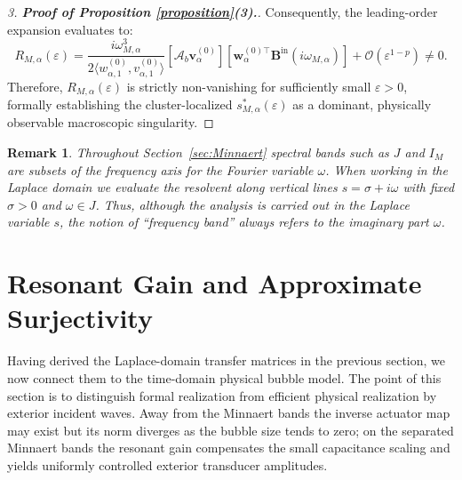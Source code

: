 \documentclass[11pt,a4paper]{article}
\numberwithin{equation}{section}
\newtheorem{remark}[theorem]{Remark}
\begin{document}
\begin{proof}[3. \textbf{Proof of Proposition \ref{proposition}(3).}]
\newline
Consequently, the leading-order expansion evaluates to:
\begin{equation}
    R_{M, \alpha}(\varepsilon) = \frac{i\omega_{M,\alpha}^3}{2\langle w_{\alpha, 1}^{(0)}, v_{\alpha, 1}^{(0)} \rangle} \left[ \mathcal{A}_b \mathbf{v}_\alpha^{(0)} \right] \left[ \mathbf{w}_\alpha^{(0)\top} \mathbf{B}^{\text{in}}(i\omega_{M,\alpha}) \right] + \mathcal{O}(\varepsilon^{1-p}) \neq 0.
\end{equation}
Therefore, $R_{M, \alpha}(\varepsilon)$ is strictly non-vanishing for sufficiently small $\varepsilon > 0$, formally establishing the cluster-localized $s_{M, \alpha}^\ast(\varepsilon)$ as a dominant, physically observable macroscopic singularity.

\end{proof}


\begin{remark}
Throughout Section~\ref{sec:Minnaert} spectral bands such as $J$ and
$I_M$ are subsets of the frequency axis for the Fourier variable $\omega$.
When working in the Laplace domain we evaluate the resolvent along vertical
lines $s = \sigma + i\omega$ with fixed $\sigma > 0$ and $\omega \in J$.
Thus, although the analysis is carried out in the Laplace variable $s$, the
notion of “frequency band” always refers to the imaginary part $\omega$.
\end{remark}






\section{Resonant Gain and Approximate Surjectivity}
\label{sec:resonant-gain}
\noindent
Having derived the Laplace-domain transfer matrices in the previous section, we now connect them to the time-domain physical bubble model. The point of this section is to distinguish formal realization from efficient physical realization by exterior incident waves. Away from the Minnaert bands the inverse actuator map may exist but its norm diverges as the bubble size tends to zero; on the separated Minnaert bands the resonant gain compensates the small capacitance scaling and yields uniformly controlled exterior transducer amplitudes.

\end{document}
